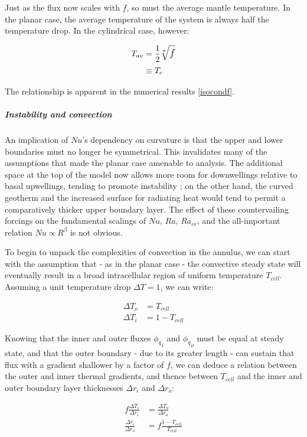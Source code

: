 \documentclass[a4paper,11pt,oneside]{book}
\begin{document}
Just as the flux now scales with $f$, so must the average mantle temperature. In the planar case, the average temperature of the system is always half the temperature drop. In the cylindrical case, however:

\begin{align*}
T_{av} &= \dfrac{1}{2} \large{\root \huge{e} \of f} \\
&\equiv T_{c}
\end{align*}

The relationship is apparent in the numerical results \ref{isocondf}.

\subparagraph{Instability and convection}

An implication of $Nu$'s dependency on curvature is that the upper and lower boundaries must no longer be symmetrical. This invalidates many of the assumptions that made the planar case amenable to analysis. The additional space at the top of the model now allows more room for downwellings relative to basal upwellings, tending to promote instability \cite{Jarvis1991-ir}; on the other hand, the curved geotherm and the increased surface for radiating heat would tend to permit a comparatively thicker upper boundary layer. The effect of these countervailing forcings on the fundamental scalings of $Nu$, $Ra$, $Ra_{cr}$, and the all-important relation $Nu \propto R^{\beta}$ is not obvious.

To begin to unpack the complexities of convection in the annulus, we can start with the assumption that - as in the planar case - the convective steady state will eventually result in a broad intracellular region of uniform temperature $T_{cell}$. Assuming a unit temperature drop $\Delta T = 1$, we can write:

\begin{align*}
{\Delta T}_o &= T_{cell} \\
{\Delta T}_i &= 1 - T_{cell}
\end{align*}

Knowing that the inner and outer fluxes ${\phi_q}_i$ and ${\phi_q}_o$ must be equal at steady state, and that the outer boundary - due to its greater length - can sustain that flux with a gradient shallower by a factor of $f$, we can deduce a relation between the outer and inner thermal gradients, and thence between $T_{cell}$ and the inner and outer boundary layer thicknesses ${\Delta r}_i$ and ${\Delta r}_o$:

\begin{align*}
f \frac{{\Delta T}_i}{{\Delta r}_i} &= \frac{{\Delta T}_o}{{\Delta r}_o} \\
\frac{{\Delta r}_i}{{\Delta r}_o} &= f \frac{1 - T_{cell}}{T_{cell}}
\end{align*}
\end{document}
